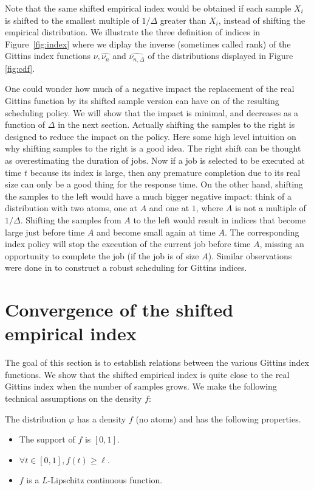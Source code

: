 \documentclass[11pt]{article}
\renewcommand{\phi}{\varphi}
\renewcommand{\geq}{\geqslant}
\begin{document}
Note that the same shifted empirical index would be obtained if each sample $X_i$  is  shifted to the smallest multiple of $1/\Delta$ greater than $X_i$, instead of shifting the empirical distribution. We illustrate the three definition of indices in Figure~\ref{fig:index} where we diplay the inverse (sometimes called rank) of the Gittins index functions $\nu,\widehat{\nu_n}$ and $\widehat{\nu_{n,\Delta}}$ of the distributions displayed in Figure \ref{fig:cdf}. %

  



One could wonder how much of a negative impact the replacement of the real Gittins function by its shifted sample version can have on of the resulting scheduling policy. We will show that the impact is minimal, and decreases as a function of ${\Delta}$ in the next section. Actually shifting  the samples to the right is designed  to reduce the  impact on the policy. Here some high level intuition on why shifting samples to the right is a good idea. The right shift can be thought as overestimating the duration of jobs. Now if a job is selected to be executed at time $t$ because its index is large, then any premature completion due to its real size can only be a good thing for the response time. On the other hand, shifting the samples to the left would have a much bigger negative impact: think of a distribution with two atoms, one at $A$ and one at $1$, where $A$ is not a multiple of $1/\Delta$. Shifting  the samples from $A$ to the left would result in indices that become large just before time $A$ and become small again at time $A$. The corresponding index policy will stop the execution of the current  job before time $A$, missing an opportunity to complete the job (if the job is of size $A$). Similar observations were done in  \cite{moseley2025robust} to construct a robust scheduling for Gittins indices. 


\section{Convergence of the shifted empirical index}

The goal of this section is to establish relations between the various Gittins index functions. We  show that the shifted empirical index is quite close to the real Gittins index when the number of samples grows. We make the following technical assumptions on the density $f$: 

\begin{assumption}\label{ass:1}
  The distribution $\phi$ has a density $f$ (no atoms) and has the following properties.
 \begin{itemize}
    \item The support of $f$ is $[0, 1]$.
    \item $\forall t \in [0, 1], f(t) \geq \ell$.
    \item $f$ is a $L$-Lipschitz continuous function.
    \end{itemize}
  \end{assumption}
\end{document}
